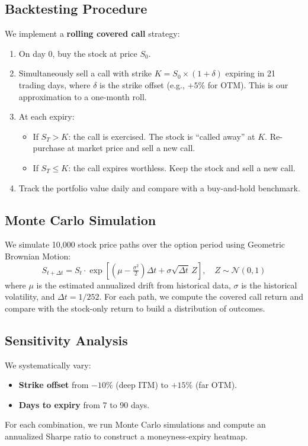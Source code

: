 \documentclass[12pt, a4paper]{article}
\begin{document}
\subsection{Backtesting Procedure}

We implement a \textbf{rolling covered call} strategy:
\begin{enumerate}
    \item On day 0, buy the stock at price $S_0$.
    \item Simultaneously sell a call with strike $K = S_0 \times (1 + \delta)$ expiring in 21 trading days, where $\delta$ is the strike offset (e.g., $+5\%$ for OTM). This is our approximation to a one-month roll.
    \item At each expiry:
    \begin{itemize}
        \item If $S_T > K$: the call is exercised. The stock is ``called away'' at $K$. Re-purchase at market price and sell a new call.
        \item If $S_T \leq K$: the call expires worthless. Keep the stock and sell a new call.
    \end{itemize}
    \item Track the portfolio value daily and compare with a buy-and-hold benchmark.
\end{enumerate}

\subsection{Monte Carlo Simulation}

We simulate 10{,}000 stock price paths over the option period using Geometric Brownian Motion:
\begin{equation}
    S_{t+\Delta t} = S_t \cdot \exp\!\left[\left(\mu - \tfrac{\sigma^2}{2}\right)\Delta t + \sigma \sqrt{\Delta t} \, Z\right], \quad Z \sim \mathcal{N}(0,1)
\end{equation}
where $\mu$ is the estimated annualized drift from historical data, $\sigma$ is the historical volatility, and $\Delta t = 1/252$. For each path, we compute the covered call return and compare with the stock-only return to build a distribution of outcomes.

\subsection{Sensitivity Analysis}

We systematically vary:
\begin{itemize}
    \item \textbf{Strike offset} from $-10\%$ (deep ITM) to $+15\%$ (far OTM).
    \item \textbf{Days to expiry} from 7 to 90 days.
\end{itemize}
For each combination, we run Monte Carlo simulations and compute an annualized Sharpe ratio to construct a moneyness-expiry heatmap.
\end{document}
